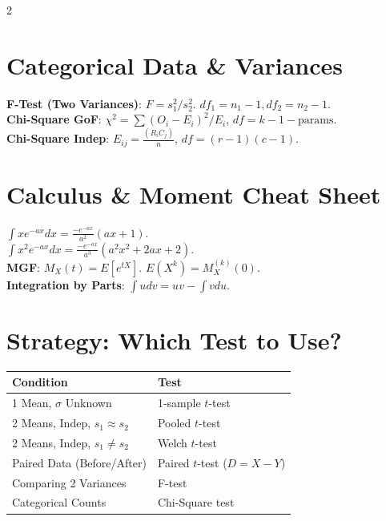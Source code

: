 \documentclass[10pt]{article}
\begin{document}
\begin{multicols}{2}
\section*{Categorical Data \& Variances}
\textbf{F-Test (Two Variances)}: $F = s_1^2 / s_2^2$. $df_1 = n_1-1, df_2 = n_2-1$. \\
\textbf{Chi-Square GoF}: $\chi^2 = \sum (O_i - E_i)^2/E_i$, $df=k-1-\text{params}$. \\
\textbf{Chi-Square Indep}: $E_{ij} = \frac{(R_i C_j)}{n}$, $df = (r-1)(c-1)$.

\columnbreak

\section*{Calculus \& Moment Cheat Sheet}
$\int x e^{-ax} dx = \frac{-e^{-ax}}{a^2}(ax+1)$. \\
$\int x^2 e^{-ax} dx = \frac{-e^{-ax}}{a^3}(a^2x^2 + 2ax + 2)$. \\
\textbf{MGF}: $M_X(t) = E[e^{tX}]$. $E(X^k) = M_X^{(k)}(0)$. \\
\textbf{Integration by Parts}: $\int u dv = uv - \int v du$.

\section*{Strategy: Which Test to Use?}
\begin{tabular}{|l|l|}
\hline
\textbf{Condition} & \textbf{Test} \\ \hline
1 Mean, $\sigma$ Unknown & 1-sample $t$-test \\ \hline
2 Means, Indep, $s_1 \approx s_2$ & Pooled $t$-test \\ \hline
2 Means, Indep, $s_1 \neq s_2$ & Welch $t$-test \\ \hline
Paired Data (Before/After) & Paired $t$-test ($D = X-Y$) \\ \hline
Comparing 2 Variances & F-test \\ \hline
Categorical Counts & Chi-Square test \\ \hline
\end{tabular}


\end{multicols}
\end{document}
